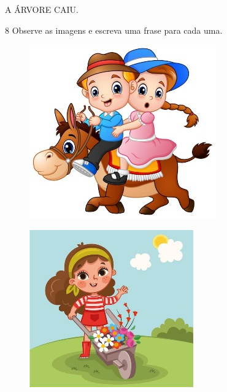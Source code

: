 \begin{mdframed}[linewidth=2pt,linecolor=salmao]
\vspace{7,5cm}
\end{mdframed}

\begin{myquote}
\centering
A ÁRVORE CAIU.
\end{myquote}

\begin{mdframed}[linewidth=2pt,linecolor=salmao]
\vspace{7,5cm}
\end{mdframed}


\pagebreak

\num{8} Observe as imagens e escreva uma frase para cada uma.


\begin{figure}[H]
\centering
\includegraphics[width=.55\textwidth]{media/image67.jpeg}
\end{figure}


\begin{figure}[H]
\centering
\includegraphics[width=.6\textwidth]{media/image68.jpeg}
\end{figure}

